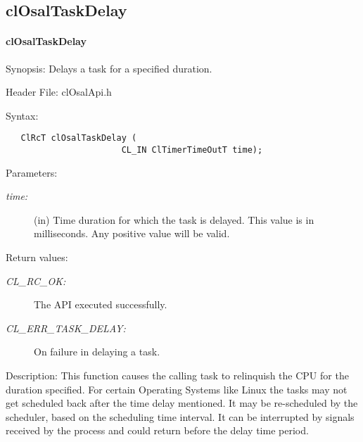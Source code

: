 \subsection{clOsalTaskDelay}
\hypertarget{pageosal109}{}\paragraph{cl\-Osal\-Task\-Delay}\label{pageosal109}
\begin{Desc}
\item[Synopsis:]Delays a task for a specified duration.\end{Desc}
\begin{Desc}
\item[Header File:]clOsalApi.h\end{Desc}
\begin{Desc}
\item[Syntax:]

\footnotesize\begin{verbatim}   ClRcT clOsalTaskDelay (
                       CL_IN ClTimerTimeOutT time);
\end{verbatim}
\normalsize
\end{Desc}
\begin{Desc}
\item[Parameters:]
\begin{description}
\item[{\em time:}](in) Time duration for which the task is delayed. This value is in milliseconds. Any positive value will be valid.\end{description}
\end{Desc}
\begin{Desc}
\item[Return values:]
\begin{description}
\item[{\em CL\_\-RC\_\-OK:}]The API executed successfully. \item[{\em CL\_\-ERR\_\-TASK\_\-DELAY:}]On failure in delaying a task.\end{description}
\end{Desc}
\begin{Desc}
\item[Description:]This function causes the calling task to relinquish the CPU for the duration specified. For certain Operating Systems like Linux the tasks may not get scheduled back after the time delay mentioned. It may be re-scheduled by the scheduler, based on the scheduling time interval. It can be interrupted by signals received by the process and could return before the delay time period.\end{Desc}
